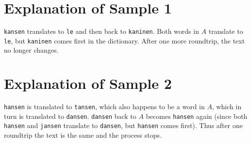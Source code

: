 \section*{Explanation of Sample 1}
\texttt{kansen} translates to \texttt{le} and then back to \texttt{kaninen}. Both words in $A$ translate to \texttt{le}, but \texttt{kaninen} comes first in the dictionary. After one more roundtrip, the text no longer changes.

\section*{Explanation of Sample 2}
\texttt{hansen} is translated to \texttt{tansen}, which also happens to be a word in $A$, which in turn is translated to \texttt{dansen}. \texttt{dansen} back to $A$ becomes \texttt{hansen} again (since both \texttt{hansen} and \texttt{jansen} translate to \texttt{dansen}, but \texttt{hansen} comes first). Thus after one roundtrip the text is the same and the process stops.
